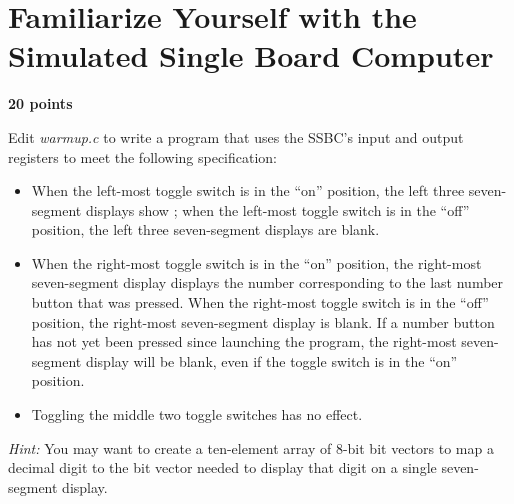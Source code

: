 \documentclass[12pt]{article}
\begin{document}
\section{Familiarize Yourself with the Simulated Single Board Computer}

\textbf{20 points}

Edit \textit{warmup.c} to write a program that uses the SSBC's input and output
registers to meet the following specification:

\begin{itemize}
    \item When the left-most toggle switch is in the ``on'' position, the left
        three seven-segment displays show {}; when the
        left-most toggle switch is in the ``off'' position, the left three
        seven-segment displays are blank.
    \item When the right-most toggle switch is in the ``on'' position, the
        right-most seven-segment display displays the number corresponding to
        the last number button that was pressed. When the right-most toggle
        switch is in the ``off'' position, the right-most seven-segment display
        is blank. If a number button has not yet been pressed since launching
        the program, the right-most seven-segment display will be blank, even
        if the toggle switch is in the ``on'' position.
    \item Toggling the middle two toggle switches has no effect.
\end{itemize}

\textit{Hint:} You may want to create a ten-element array of 8-bit bit vectors
to map a decimal digit to the bit vector needed to display that digit on a
single seven-segment display.

\vspace{0.5cm}
\end{document}

